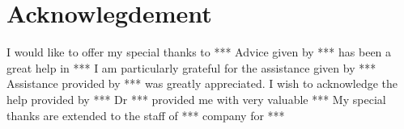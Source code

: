 \documentclass[
    pagesize,%
    a4paper,%
    headsepline,%
    footsepline,%
    headinclude,%
    footinclude,%
    bibtotoc,%
    cleardoubleplain,%
    tablecaptionabove,%
]{scrreprt}
\begin{document}
%

%

\clearpage



\newpage
\chapter*{Acknowlegdement}

I would like to offer my special thanks to ***
Advice given by *** has been a great help in ***
I am particularly grateful for the assistance given by ***
Assistance provided by *** was greatly appreciated.
I wish to acknowledge the help provided by ***
Dr *** provided me with very valuable ***
My special thanks are extended to the staff of *** company for ***
\end{document}
